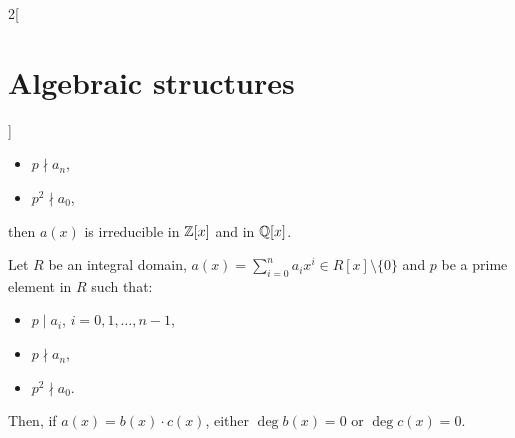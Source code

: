 \documentclass[../../../main.tex]{subfiles}
\begin{document}
\begin{multicols}{2}[\section{Algebraic structures}]
\begin{theorem}
\begin{itemize}
        \item $p\nmid a_n$,
        \item $p^2\nmid a_0$,
    \end{itemize}
    then $a(x)$ is irreducible in $\mathbb{Z}[x]$ and in $\mathbb{Q}[x]$.
\end{theorem}
\begin{theorem}
    Let $R$ be an integral domain, $a(x)=\sum_{i=0}^na_ix^i\in R[x]\setminus\{0\}$ and $p$ be a prime element in $R$ such that:
    \begin{itemize}
        \item $p\mid a_i$, $i=0,1,\ldots,n-1$,
        \item $p\nmid a_n$,
        \item $p^2\nmid a_0$.
    \end{itemize}
    Then, if $a(x)=b(x)\cdot c(x)$, either $\deg b(x)=0$ or $\deg c(x)=0$.
\end{theorem}

\end{multicols}
\end{document}
